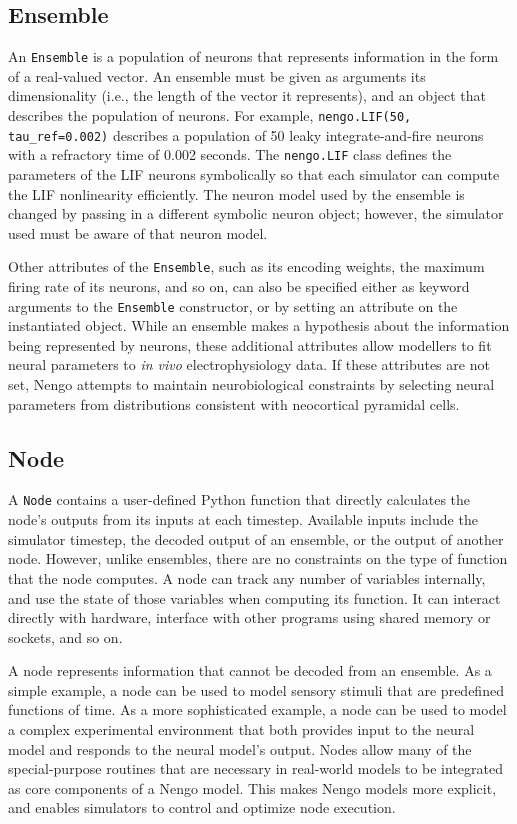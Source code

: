 \documentclass{frontiersSCNS}
\begin{document}
\subsection{Ensemble}

An \texttt{Ensemble} is
a population of neurons
that represents information
in the form of a real-valued vector.
An ensemble must be given as arguments
its dimensionality
(i.e., the length of the vector it represents),
and an object that describes
the population of neurons.
For example, \texttt{nengo.LIF(50, tau\_ref=0.002)}
describes a population
of 50 leaky integrate-and-fire neurons \cite{TODO} %
with a refractory time of 0.002 seconds.
The \texttt{nengo.LIF} class defines
the parameters of the LIF neurons symbolically
so that each simulator can compute
the LIF nonlinearity efficiently.
The neuron model used by the ensemble
is changed by passing in a different symbolic neuron object;
however, the simulator used must be aware
of that neuron model.

Other attributes of the \texttt{Ensemble},
such as its encoding weights,
the maximum firing rate of its neurons,
and so on, can also be specified
either as keyword arguments
to the \texttt{Ensemble} constructor,
or by setting an attribute on the instantiated object.
While an ensemble makes a hypothesis
about the information being represented by neurons,
these additional attributes
allow modellers to fit
neural parameters to \textit{in vivo}
electrophysiology data.
If these attributes are not set,
Nengo attempts to maintain
neurobiological constraints
by selecting neural parameters
from distributions consistent with
neocortical pyramidal cells.

\subsection{Node}

A \texttt{Node} contains a user-defined
Python function that directly calculates
the node's outputs from its inputs at each timestep.
Available inputs include
the simulator timestep,
the decoded output of an ensemble,
or the output of another node.
However, unlike ensembles,
there are no constraints on the type
of function that the node computes.
A node can track any number of variables internally,
and use the state of those variables
when computing its function.
It can interact directly with hardware,
interface with other programs
using shared memory or sockets,
and so on.

A node represents information
that cannot be decoded from an ensemble.
As a simple example,
a node can be used to model sensory stimuli
that are predefined functions of time.
As a more sophisticated example,
a node can be used to model
a complex experimental environment that
both provides input to the neural model
and responds to the neural model's output.
Nodes allow many of the special-purpose
routines that are necessary in real-world
models to be integrated
as core components of a Nengo model.
This makes Nengo models more explicit,
and enables simulators
to control and optimize node execution.
\end{document}
